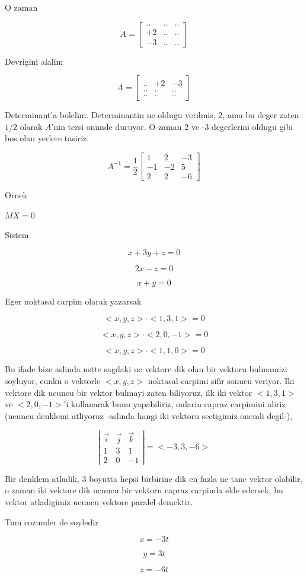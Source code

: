 \documentclass[12pt,fleqn]{article}\usepackage{../common}
\begin{document}
O zaman

\[ A = 
\left[\begin{array}{rrr}
.. & .. & ..\\
+2 & .. & ..\\
-3 & .. & ..
\end{array}\right]
 \]

Devrigini alalim

\[ A = 
\left[\begin{array}{rrr}
.. & +2 & -3\\
.. & .. & ..\\
.. & .. & ..
\end{array}\right]
 \]

Determinant'a bolelim. Determinantin ne oldugu verilmis, 2, ama bu deger zaten $1/2$
olarak $A$'nin tersi onunde duruyor. O zaman 2 ve -3 degerlerini oldugu gibi bos
olan yerlere tasiriz. 

\[ A^{-1} = \frac{1}{2}
\left[\begin{array}{rrr}
1 & 2 & -3 \\
-1 & -2 & 5 \\
2 & 2 & -6
\end{array}\right]
 \]


Ornek

$MX = 0$

Sistem

\[ x + 3y + z = 0 \]

\[ 2x - z  = 0\]

\[ x + y = 0 \]

Eger noktasal carpim olarak yazarsak 

\[ <x,y,z> \cdot <1,3,1> = 0 \]

\[ <x,y,z> \cdot <2,0,-1> = 0 \]

\[ <x,y,z> \cdot <1,1,0> = 0 \]

Bu ifade bize aslinda ustte sagdaki uc vektore dik olan bir vektoru bulmamizi
soyluyor, cunku o vektorle $<x,y,z>$ noktasal carpimi sifir sonucu veriyor. Iki
vektore dik ucuncu bir vektor bulmayi zaten biliyoruz, ilk iki vektor $<1,3,1>$
ve $<2,0,-1>$'i kullanarak bunu yapabiliriz, onlarin capraz carpimini aliriz
(ucuncu denklemi atliyoruz -aslinda hangi iki vektoru sectigimiz onemli degil-),

\[ 
\left|\begin{array}{rrr}
\vec{i} & \vec{j} & \vec{k}  \\
1 & 3 & 1 \\
2 & 0 & -1
\end{array}\right| = <-3,3,-6>
\]

Bir denklem atladik, 3 boyutta hepsi birbirine dik en fazla uc tane vektor
olabilir, o zaman iki vektore dik ucuncu bir vektoru capraz carpimla elde
edersek, bu vektor atladigimiz ucuncu vektore paralel demektir. 

Tum cozumler de soyledir

\[ x = -3t \]

\[ y = 3t \]

\[ z = -6t \]
\end{document}
